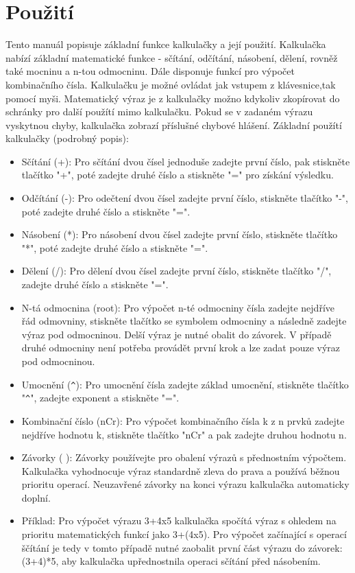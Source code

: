 \documentclass[a4paper, 11pt]{article}
\begin{document}
	\section{Použití}
        Tento manuál popisuje základní funkce kalkulačky a její použití. Kalkulačka nabízí základní matematické funkce - sčítání, odčítání, násobení, dělení, rovněž také mocninu a n-tou odmocninu. Dále disponuje funkcí pro výpočet kombinačního čísla. Kalkulačku je možné ovládat jak vstupem z klávesnice,tak pomocí myši. Matematický výraz je z kalkulačky možno kdykoliv zkopírovat do schránky pro další použítí mimo kalkulačku. Pokud se v zadaném výrazu vyskytnou chyby, kalkulačka zobrazí příslušné chybové hlášení. 
        Základní použítí kalkulačky (podrobný popis):
    \begin{itemize}
        \item Sčítání (+): Pro sčítání dvou čísel jednoduše zadejte první číslo, pak stiskněte tlačítko "+", poté zadejte druhé číslo a stiskněte "=" pro získání výsledku.
        \item Odčítání (-): Pro odečtení dvou čísel zadejte první číslo, stiskněte tlačítko "-", poté zadejte druhé číslo a stiskněte "=".
        \item Násobení (*): Pro násobení dvou čísel zadejte první číslo, stiskněte tlačítko "*", poté zadejte druhé číslo a stiskněte "=".
        \item Dělení (/): Pro dělení dvou čísel zadejte první číslo, stiskněte tlačítko "/", zadejte druhé číslo a stiskněte "=".
        \item N-tá odmocnina (root): Pro výpočet n-té odmocniny čísla zadejte nejdříve řád odmovniny, stiskněte tlačítko se symbolem odmocniny a následně zadejte výraz pod odmocninou. Delší výraz je nutné obalit do závorek. V případě druhé odmocniny není potřeba provádět první krok a lze zadat pouze výraz pod odmocninou.
        \item Umocnění (\verb|^|): Pro umocnění čísla zadejte základ umocnění, stiskněte tlačítko "\verb|^|", zadejte exponent a stiskněte "=".
        \item Kombinační číslo (nCr): Pro výpočet kombinačního čísla k z n prvků zadejte nejdříve hodnotu k, stiskněte tlačítko "nCr" a pak zadejte druhou hodnotu n.
        \item Závorky ( ): Závorky používejte pro obalení výrazů s přednostním výpočtem. Kalkulačka vyhodnocuje výraz standardně zleva do prava a používá běžnou prioritu operací. Neuzavřené závorky na konci výrazu kalkulačka automaticky doplní.
        \item Příklad: Pro výpočet výrazu 3+4x5 kalkulačka spočítá výraz s ohledem na prioritu matematických funkcí jako 3+(4x5). Pro výpočet začínající s operací ščítání je tedy v tomto případě nutné zaobalit první část výrazu do závorek: (3+4)*5, aby kalkulačka upřednostnila operaci sčítání před násobením.
    \end{itemize}
\end{document}
